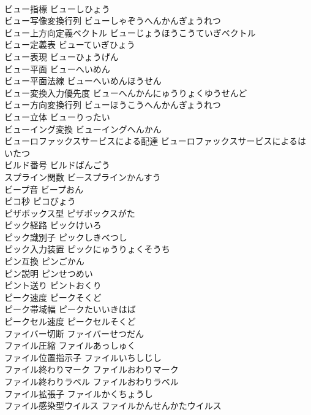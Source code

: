 \documentclass[8pt]{extreport}
\begin{document}
\begin{CJK}{UTF8}{min}
\\	ビュー指標	ビューしひょう	
\\	ビュー写像変換行列	ビューしゃぞうへんかんぎょうれつ	
\\	ビュー上方向定義ベクトル	ビューじょうほうこうていぎベクトル	
\\	ビュー定義表	ビューていぎひょう	
\\	ビュー表現	ビューひょうげん	
\\	ビュー平面	ビューへいめん	
\\	ビュー平面法線	ビューへいめんほうせん	
\\	ビュー変換入力優先度	ビューへんかんにゅうりょくゆうせんど	
\\	ビュー方向変換行列	ビューほうこうへんかんぎょうれつ	
\\	ビュー立体	ビューりったい	
\\	ビューイング変換	ビューイングへんかん	
\\	ビューロファックスサービスによる配達	ビューロファックスサービスによるはいたつ	
\\	ビルド番号	ビルドばんごう	
\\	スプライン関数	ビースプラインかんすう	
\\	ビープ音	ビープおん	
\\	ピコ秒	ピコびょう	
\\	ピザボックス型	ピザボックスがた	
\\	ピック経路	ピックけいろ	
\\	ピック識別子	ピックしきべつし	
\\	ピック入力装置	ピックにゅうりょくそうち	
\\	ピン互換	ピンごかん	
\\	ピン説明	ピンせつめい	
\\	ピント送り	ピントおくり	
\\	ピーク速度	ピークそくど	
\\	ピーク帯域幅	ピークたいいきはば	
\\	ピークセル速度	ピークセルそくど	
\\	ファイバー切断	ファイバーせつだん	
\\	ファイル圧縮	ファイルあっしゅく	
\\	ファイル位置指示子	ファイルいちしじし	
\\	ファイル終わりマーク	ファイルおわりマーク	
\\	ファイル終わりラベル	ファイルおわりラベル	
\\	ファイル拡張子	ファイルかくちょうし	
\\	ファイル感染型ウイルス	ファイルかんせんかたウイルス	

\end{CJK}
\end{document}
